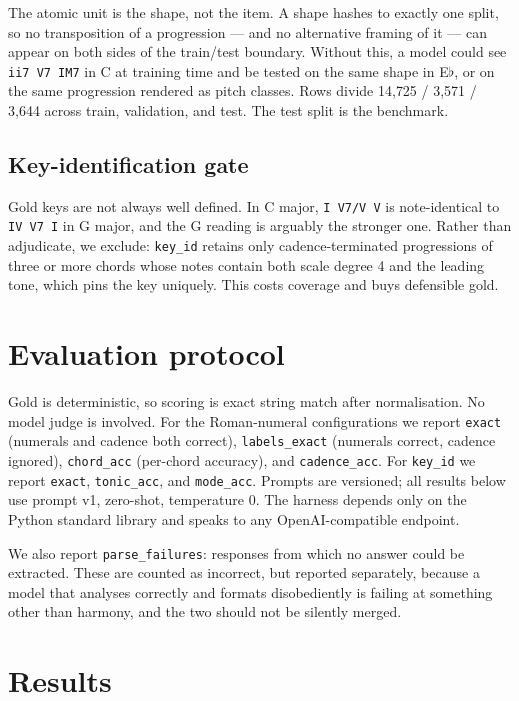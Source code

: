 \documentclass[11pt]{article}
\begin{document}
The atomic unit is the shape, not the item. A shape hashes to exactly one split,
so no transposition of a progression --- and no alternative framing of it ---
can appear on both sides of the train/test boundary. Without this, a model could
see \texttt{ii7 V7 IM7} in C at training time and be tested on the same shape in
E$\flat$, or on the same progression rendered as pitch classes. Rows divide
14{,}725 / 3{,}571 / 3{,}644 across train, validation, and test. The test split
is the benchmark.

\subsection{Key-identification gate}

Gold keys are not always well defined. In C major, \texttt{I V7/V V} is
note-identical to \texttt{IV V7 I} in G major, and the G reading is arguably the
stronger one. Rather than adjudicate, we exclude: \texttt{key\_id} retains only
cadence-terminated progressions of three or more chords whose notes contain both
scale degree 4 and the leading tone, which pins the key uniquely. This costs
coverage and buys defensible gold.

\section{Evaluation protocol}

Gold is deterministic, so scoring is exact string match after normalisation. No
model judge is involved. For the Roman-numeral configurations we report
\texttt{exact} (numerals and cadence both correct), \texttt{labels\_exact}
(numerals correct, cadence ignored), \texttt{chord\_acc} (per-chord accuracy),
and \texttt{cadence\_acc}. For \texttt{key\_id} we report \texttt{exact},
\texttt{tonic\_acc}, and \texttt{mode\_acc}. Prompts are versioned; all results
below use prompt v1, zero-shot, temperature 0. The harness depends only on the
Python standard library and speaks to any OpenAI-compatible endpoint.

We also report \texttt{parse\_failures}: responses from which no answer could be
extracted. These are counted as incorrect, but reported separately, because a
model that analyses correctly and formats disobediently is failing at something
other than harmony, and the two should not be silently merged.

\section{Results}
\end{document}
